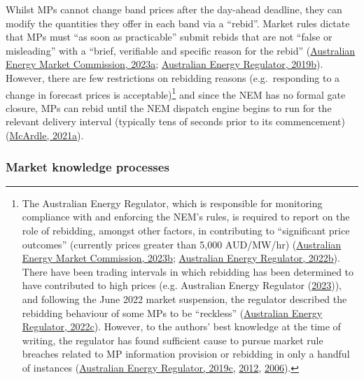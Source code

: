 \documentclass[12pt,a4paper,]{report}
\begin{document}
Whilst MPs cannot change band prices after the day-ahead deadline, they
can modify the quantities they offer in each band via a ``rebid''.
Market rules dictate that MPs must ``as soon as practicable'' submit
rebids that are not ``false or misleading'' with a ``brief, verifiable
and specific reason for the rebid''
(\protect\hyperlink{ref-australianenergymarketcommissionNationalElectricityRules2023}{Australian
Energy Market Commission, 2023a};
\protect\hyperlink{ref-australianenergyregulatorRebiddingTechnicalParameters2019}{Australian
Energy Regulator, 2019b}). However, there are few restrictions on
rebidding reasons (e.g.~responding to a change in forecast prices is
acceptable)\footnote{The Australian Energy Regulator, which is
  responsible for monitoring compliance with and enforcing the NEM's
  rules, is required to report on the role of rebidding, amongst other
  factors, in contributing to ``significant price outcomes'' (currently
  prices greater than 5,000 AUD/MW/hr)
  (\protect\hyperlink{ref-australianenergymarketcommissionNationalElectricityRules2023a}{Australian
  Energy Market Commission, 2023b};
  \protect\hyperlink{ref-australianenergyregulatorSignificantPriceReporting2022}{Australian
  Energy Regulator, 2022b}). There have been trading intervals in which
  rebidding has been determined to have contributed to high prices (e.g.
  Australian Energy Regulator
  (\protect\hyperlink{ref-australianenergyregulatorElectricityPrices0002023}{2023})),
  and following the June 2022 market suspension, the regulator described
  the rebidding behaviour of some MPs to be ``reckless''
  (\protect\hyperlink{ref-australianenergyregulatorJune2022Market2022}{Australian
  Energy Regulator, 2022c}). However, to the authors' best knowledge at
  the time of writing, the regulator has found sufficient cause to
  pursue market rule breaches related to MP information provision or
  rebidding in only a handful of instances
  (\protect\hyperlink{ref-australianenergyregulatorPelicanPointPower2019}{Australian
  Energy Regulator, 2019c},
  \protect\hyperlink{ref-australianenergyregulatorQueenslandGeneratorStanwell2012}{2012},
  \protect\hyperlink{ref-australianenergyregulatorInfringementNoticeAGL2006}{2006}).}
and since the NEM has no formal gate closure, MPs can rebid until the
NEM dispatch engine begins to run for the relevant delivery interval
(typically tens of seconds prior to its commencement)
(\protect\hyperlink{ref-mcardleTwoRecentImprovements2021}{McArdle,
2021a}).

\hypertarget{sec:info-context-nem-knowledge_processes}{%
\subsubsection{Market knowledge
processes}\label{sec:info-context-nem-knowledge_processes}}
\end{document}
